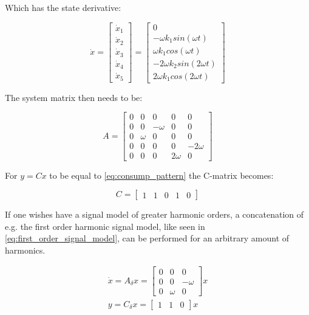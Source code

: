 Which has the state derivative:

\begin{equation} \label{eq:consump_x_deriv_l}
	\dot x =  \begin{bmatrix}
		\dot x_1 \\
		\dot x_2 \\
		\dot x_3 \\
		\dot x_4 \\
		\dot x_5
	\end{bmatrix}
	=
	\begin{bmatrix}
		0 \\
		- \omega k_1 sin(\omega t) \\
		\omega k_1 cos(\omega t) \\
		- 2\omega k_2 sin (2 \omega t) \\
		2 \omega k_1 cos(2 \omega t)
	\end{bmatrix}
\end{equation}


The system matrix then needs to be:

\begin{equation} \label{eq:consump_A}
A = 
\begin{bmatrix}
	0 & 0 & 0 & 0 & 0 \\
	0 & 0 & -\omega & 0 & 0 \\
	0 & \omega & 0 & 0 & 0 \\
	0 & 0 & 0 & 0 & -2\omega \\
	0 & 0 & 0 & 2\omega & 0 
\end{bmatrix}
\end{equation}

For $y = Cx$ to be equal to \cref{eq:consump_pattern} the C-matrix becomes: 

\begin{equation}
	C = \begin{bmatrix} 1 & 1 & 0 & 1 & 0 \end{bmatrix}
\end{equation}

If one wishes have a signal model of greater harmonic orders, a concatenation of e.g. the first order harmonic signal model, like seen in \cref{eq:first_order_signal_model}, can be performed for an arbitrary amount of harmonics. 

\begin{equation}\label{eq:first_order_signal_model}
	\begin{gathered}
		\dot{x} = A_\delta x =  \begin{bmatrix}0 & 0 & 0 \\ 0 & 0 & -\omega \\ 0 & \omega & 0	\end{bmatrix}x \\
		y = C_\delta x = \begin{bmatrix} 1 & 1 & 0 \end{bmatrix} x
	\end{gathered}
\end{equation}

